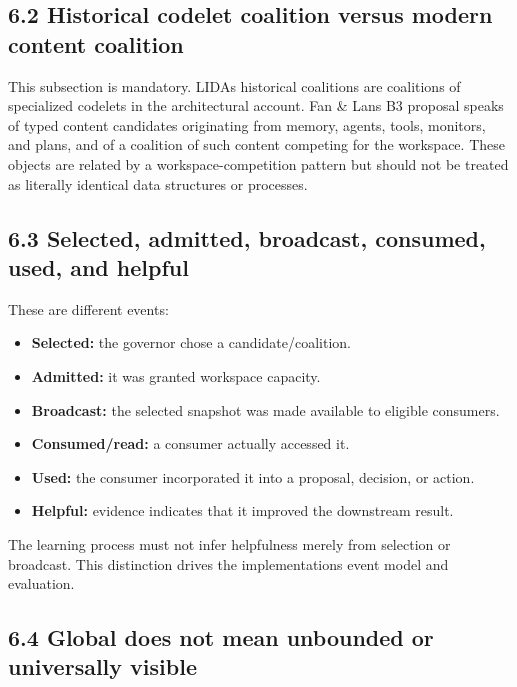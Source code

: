 \subsection{6.2 Historical codelet coalition versus modern content coalition}\label{62-historical-codelet-coalition-versus-modern-content-coalition}

This subsection is mandatory. LIDA\textquotesingle s historical coalitions are coalitions of specialized codelets in the architectural account. Fan \& Lan\textquotesingle s B3 proposal speaks of typed content candidates originating from memory, agents, tools, monitors, and plans, and of a coalition of such content competing for the workspace. These objects are related by a workspace-competition pattern but should not be treated as literally identical data structures or processes.

\subsection{6.3 Selected, admitted, broadcast, consumed, used, and helpful}\label{63-selected-admitted-broadcast-consumed-used-and-helpful}

These are different events:

\begin{itemize}
\tightlist
\item
  \textbf{Selected:} the governor chose a candidate/coalition.
\item
  \textbf{Admitted:} it was granted workspace capacity.
\item
  \textbf{Broadcast:} the selected snapshot was made available to eligible consumers.
\item
  \textbf{Consumed/read:} a consumer actually accessed it.
\item
  \textbf{Used:} the consumer incorporated it into a proposal, decision, or action.
\item
  \textbf{Helpful:} evidence indicates that it improved the downstream result.
\end{itemize}

The learning process must not infer helpfulness merely from selection or broadcast. This distinction drives the implementation\textquotesingle s event model and evaluation.

\subsection{6.4 Global does not mean unbounded or universally visible}\label{64-global-does-not-mean-unbounded-or-universally-visible}

